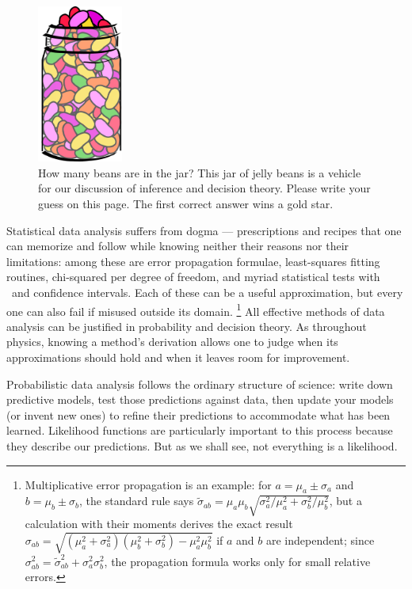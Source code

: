 \begin{figure}[tp]
\centering
\includegraphics[width=0.25\textwidth]{figures/searches_beans.pdf}
\caption[
How many beans are in the jar?
]{%
How many beans are in the jar? This jar of jelly beans is a vehicle for our
discussion of inference and decision theory.
Please write your guess on this page.
The first correct answer wins a gold star.
}
\label{fig:searches_beans}
\end{figure}

Statistical data analysis suffers from dogma --- prescriptions and recipes that
one can memorize and follow while knowing neither their reasons nor their
limitations:
among these are
error propagation formulae,
least-squares fitting routines,
chi-squared per degree of freedom,
and myriad statistical tests with \pvalues\ and confidence intervals.
Each of these can be a useful approximation, but every one can also fail if
misused outside its domain.%
\footnote{%
Multiplicative error propagation is an example:
for $a = \mu_a \pm \sigma_a$ and $b = \mu_b \pm \sigma_b$,
the standard rule says
\(
\widetilde{\sigma}_{ab}
= \mu_a \mu_b \sqrt{\sigma_a^2/\mu_a^2 + \sigma_b^2/\mu_b^2}
\),
but a calculation with their moments derives the exact result
\(
\sigma_{ab}
= \sqrt{(\mu_a^2 + \sigma_a^2)(\mu_b^2 + \sigma_b^2) - \mu_a^2\mu_b^2}
\)
if $a$ and $b$ are independent;
since $\sigma_{ab}^2 = \widetilde{\sigma}_{ab}^2 + \sigma_a^2 \sigma_b^2$,
the propagation formula works only for small relative errors.
}
All effective methods of data analysis can be justified in probability and
decision theory.
As throughout physics, knowing a method's derivation allows one to judge when
its approximations should hold and when it leaves room for improvement.

Probabilistic data analysis follows the ordinary structure of science:
write down predictive models, test those predictions against data,
then update your models (or invent new ones) to refine their predictions
to accommodate what has been learned.
Likelihood functions are particularly important to this process because they
describe our predictions.
But as we shall see, not everything is a likelihood.

